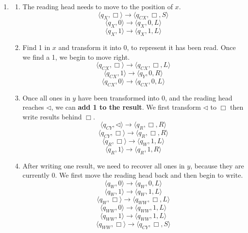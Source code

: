 \documentclass[12pt,a4paper]{article}
\makeatletter
\newtheorem*{solution}{Solution}
\theoremstyle{definition}
\renewenvironment{solution}[1][Solution] {\par\pushQED{\qed}\normalfont\topsep6\p@\@plus6\p@\relax\trivlist\item[\hskip\labelsep\bfseries#1\@addpunct{.}]\ignorespaces}{\popQED\endtrivlist\@endpefalse} \makeatother
\makeatother
\begin{document}
\begin{enumerate}
\begin{enumerate}
\begin{solution}
\begin{enumerate}
\begin{enumerate}
	       \item The reading head needs to move to the position of $x$.
	       $$
	         \langle q_{X}, \Box \rangle \rightarrow \langle q_{CX},\Box, S \rangle
	        $$
	        $$
	         \langle q_{X}, 0 \rangle \rightarrow \langle q_X,0, L \rangle
	        $$
	         $$
	         \langle q_{X}, 1 \rangle \rightarrow \langle q_X,1, L \rangle
	        $$
	      \item Find  1 in $x$ and transform it into 0, to represent it has been read. Once we find a 1, we begin to move right.
	       $$
	         \langle q_{CX}, \Box \rangle \rightarrow \langle q_{CX},\Box, L \rangle
	        $$
	      $$
	         \langle q_{CX}, 1 \rangle \rightarrow \langle q_{Y},0, R \rangle
	        $$
	        $$
	         \langle q_{CX}, 0 \rangle \rightarrow \langle q_{CX},0, L \rangle
	        $$
	     
	       \item Once all ones in $y$ have been transformed into 0, and the reading head reaches $\triangleleft$, we can \textbf{add 1 to the result}. We first transform $\triangleleft$ to $\Box$ then write results behind $\Box$.
	       $$
	       \langle q_{CY},\triangleleft \rangle \rightarrow \langle q_{R}, \Box, R\rangle
	       $$
	       $$
	       \langle q_{CY},\Box \rangle \rightarrow \langle q_{R}, \Box, R\rangle
	       $$
	       $$
	       \langle q_{R},\Box \rangle \rightarrow \langle q_{W}, 1, L\rangle
	       $$
	       $$
	       \langle q_{R},1 \rangle \rightarrow \langle q_{R}, 1, R\rangle
	       $$
	       \item After writing one result, we need to recover all ones in $y$, because they are currently 0. We first move the reading head back and then begin to write.
	        $$
	       \langle q_{W},0 \rangle \rightarrow \langle q_{W}, 0, L\rangle
	       $$
	       $$
	       \langle q_{W},1 \rangle \rightarrow \langle q_{W}, 1, L\rangle
	       $$
	       $$
	       \langle q_{W},\Box \rangle \rightarrow \langle q_{WW}, \Box, L\rangle
	       $$
	       $$
	       \langle q_{WW},0 \rangle \rightarrow \langle q_{WW}, 1, L\rangle
	       $$
	        $$
	       \langle q_{WW},1 \rangle \rightarrow \langle q_{WW}, 1, L\rangle
	       $$
	        $$
	       \langle q_{WW},\Box \rangle \rightarrow \langle q_{CY}, \Box, S\rangle
	       $$
	       

\end{enumerate}
\end{enumerate}
\end{solution}
\end{enumerate}
\end{enumerate}
\end{document}
